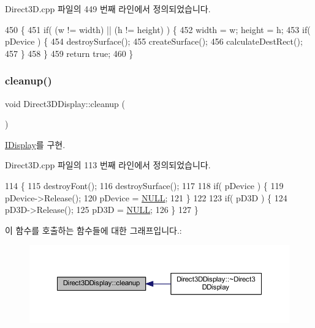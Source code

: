 Direct3\+D.\+cpp 파일의 449 번째 라인에서 정의되었습니다.


\begin{DoxyCode}
450 \{
451     \textcolor{keywordflow}{if}( (w != width) || (h != height) ) \{
452         width = w; height = h;
453         \textcolor{keywordflow}{if}( pDevice ) \{
454             destroySurface();
455             createSurface();
456             calculateDestRect();
457         \}
458     \}
459     \textcolor{keywordflow}{return} \textcolor{keyword}{true};
460 \}
\end{DoxyCode}
\mbox{\label{class_direct3_d_display_aabdde19c435c484db2e334eca28a8147}} 
\subsubsection{\texorpdfstring{cleanup()}{cleanup()}}
{\footnotesize\ttfamily void Direct3\+D\+Display\+::cleanup (\begin{DoxyParamCaption}{ }\end{DoxyParamCaption})\hspace{0.3cm}{\ttfamily [virtual]}}



\mbox{\hyperlink{class_i_display_a039e8c6b3f8fbee485fb895ef70e72c0}{I\+Display}}를 구현.



Direct3\+D.\+cpp 파일의 113 번째 라인에서 정의되었습니다.


\begin{DoxyCode}
114 \{
115     destroyFont();
116     destroySurface();
117 
118     \textcolor{keywordflow}{if}( pDevice ) \{
119         pDevice->Release();
120         pDevice = \mbox{\hyperlink{getopt1_8c_a070d2ce7b6bb7e5c05602aa8c308d0c4}{NULL}};
121     \}
122 
123     \textcolor{keywordflow}{if}( pD3D ) \{
124         pD3D->Release();
125         pD3D = \mbox{\hyperlink{getopt1_8c_a070d2ce7b6bb7e5c05602aa8c308d0c4}{NULL}};
126     \}
127 \}
\end{DoxyCode}
이 함수를 호출하는 함수들에 대한 그래프입니다.\+:
\nopagebreak
\begin{figure}[H]
\begin{center}
\leavevmode
\includegraphics[width=350pt]{class_direct3_d_display_aabdde19c435c484db2e334eca28a8147_icgraph}
\end{center}
\end{figure}
\mbox{\label{class_direct3_d_display_a67b8e31e5bb726cb82efbfb0be90935f}} 
